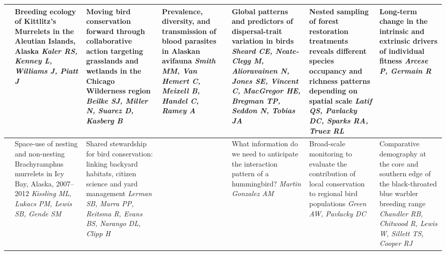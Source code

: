 \begin{tabular}{|x{0.75cm}|a{2.25cm}|a{2.25cm}|a{2.25cm}|a{2.25cm}|a{2.25cm}|x{2.25cm}|}
\hline
{}&Breeding ecology of Kittlitz’s Murrelets in the Aleutian Islands, Alaska \newline \newline \textit{Kaler RS, Kenney L, Williams J, Piatt J} & Moving bird conservation forward through collaborative action targeting grasslands and wetlands in the Chicago Wilderness region \newline \newline \textit{Beilke SJ, Miller N, Suarez D, Kasberg B} & Prevalence, diversity, and transmission of blood parasites in Alaskan avifauna \newline \newline \textit{Smith MM, Van Hemert C, Meixell B, Handel C, Ramey A} & Global patterns and predictors of dispersal-trait variation in birds \newline \newline \textit{Sheard CE, Neate-Clegg M, Alioravainen N, Jones SE, Vincent C, MacGregor HE, Bregman TP, Seddon N, Tobias JA} & Nested sampling of forest restoration treatments reveals different species occupancy and richness patterns depending on spatial scale \newline \newline \textit{Latif QS, Pavlacky DC, Sparks RA, Truex RL} & Long-term change in the intrinsic and extrinsic drivers of individual fitness \newline \newline \textit{Arcese P, Germain R}\\
\hline
{}&Space-use of nesting and non-nesting Brachyramphus murrelets in Icy Bay, Alaska, 2007–2012 \newline \newline \textit{Kissling ML, Lukacs PM, Lewis SB, Gende SM} & Shared stewardship for bird conservation: linking backyard habitats, citizen science and yard management \newline \newline \textit{Lerman SB, Marra PP, Reitsma R, Evans BS, Narango DL, Clipp H} &  \newline \newline \textit{} & What information do we need to anticipate the interaction pattern of a hummingbird? \newline \newline \textit{Martin Gonzalez AM} & Broad-scale monitoring to evaluate the contribution of local conservation to regional bird populations \newline \newline \textit{Green AW, Pavlacky DC} & Comparative demography at the core and southern edge of the black-throated blue warbler breeding range \newline \newline \textit{Chandler RB, Chitwood R, Lewis W, Sillett TS, Cooper RJ}\\

\end{tabular}
